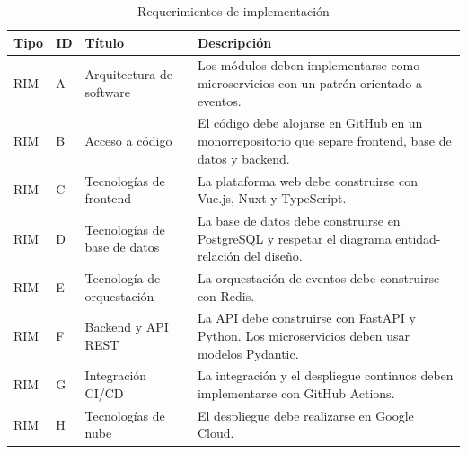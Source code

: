 \begin{table}[H]
\centering
\small
\renewcommand{\arraystretch}{1.05}
\caption{Requerimientos de implementación}
\label{tab:req_imp}
\begin{tabularx}{\textwidth}{%
    >{\centering\arraybackslash}p{}
    >{\centering\arraybackslash}p{}
    >{\raggedright\arraybackslash}p{}
    >{\raggedright\arraybackslash}X
}
\toprule
\textbf{Tipo} & \textbf{ID} & \textbf{Título} & \textbf{Descripción} \\
\midrule
RIM & A & Arquitectura de software &
Los módulos deben implementarse como microservicios con un patrón orientado a eventos. \\
RIM & B & Acceso a código &
El código debe alojarse en GitHub en un monorrepositorio que separe frontend, base de datos y backend. \\
RIM & C & Tecnologías de frontend &
La plataforma web debe construirse con Vue.js, Nuxt y TypeScript. \\
RIM & D & Tecnologías de base de datos &
La base de datos debe construirse en PostgreSQL y respetar el diagrama entidad-relación del diseño. \\
RIM & E & Tecnología de orquestación &
La orquestación de eventos debe construirse con Redis. \\
RIM & F & Backend y API REST &
La API debe construirse con FastAPI y Python. Los microservicios deben usar modelos Pydantic. \\
RIM & G & Integración CI/CD &
La integración y el despliegue continuos deben implementarse con GitHub Actions. \\
RIM & H & Tecnologías de nube &
El despliegue debe realizarse en Google Cloud. \\
\bottomrule
\end{tabularx}
\end{table}

